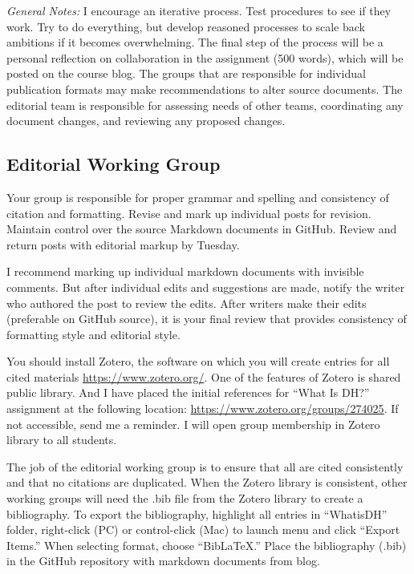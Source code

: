 \documentclass[]{article}
\begin{document}
\emph{General Notes:} I encourage an iterative process. Test procedures
to see if they work. Try to do everything, but develop reasoned
processes to scale back ambitions if it becomes overwhelming. The final
step of the process will be a personal reflection on collaboration in
the assignment (500 words), which will be posted on the course blog. The
groups that are responsible for individual publication formats may make
recommendations to alter source documents. The editorial team is
responsible for assessing needs of other teams, coordinating any
document changes, and reviewing any proposed changes.

\subsection{Editorial Working Group}\label{editorial-working-group}

Your group is responsible for proper grammar and spelling and
consistency of citation and formatting. Revise and mark up individual
posts for revision. Maintain control over the source Markdown documents
in GitHub. Review and return posts with editorial markup by Tuesday.

I recommend marking up individual markdown documents with invisible
comments. But after individual edits and suggestions are made, notify
the writer who authored the post to review the edits. After writers make
their edits (preferable on GitHub source), it is your final review that
provides consistency of formatting style and editorial style.

You should install Zotero, the software on which you will create entries
for all cited materials
\href{{[}https://www.zotero.org/}{https://www.zotero.org/}. One of the
features of Zotero is shared public library. And I have placed the
initial references for ``What Is DH?'' assignment at the following
location: \url{https://www.zotero.org/groups/274025}. If not accessible,
send me a reminder. I will open group membership in Zotero library to
all students.

The job of the editorial working group is to ensure that all are cited
consistently and that no citations are duplicated. When the Zotero
library is consistent, other working groups will need the .bib file from
the Zotero library to create a bibliography. To export the bibliography,
highlight all entries in ``WhatisDH'' folder, right-click (PC) or
control-click (Mac) to launch menu and click ``Export Items.'' When
selecting format, choose ``BibLaTeX.'' Place the bibliography (.bib) in
the GitHub repository with markdown documents from blog.
\end{document}
